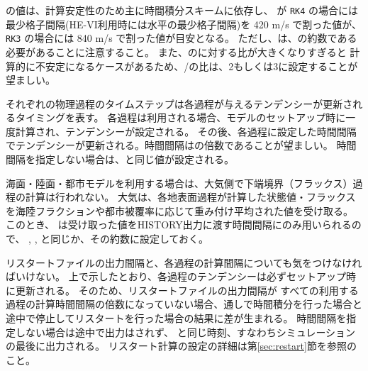 の値は、計算安定性のため主に時間積分スキームに依存し、
 が \verb|RK4| の場合には
最少格子間隔(HE-VI利用時には水平の最少格子間隔)を 420 m/s で割った値が、
\verb|RK3| の場合には 840 m/s で割った値が目安となる。
ただし、は、の約数である必要があることに注意すること。
また、のに対する比が大きくなりすぎると
計算的に不安定になるケースがあるため、/の比は、2もしくは3に設定することが望ましい。


それぞれの物理過程のタイムステップは各過程が与えるテンデンシーが更新されるタイミングを表す。
各過程は利用される場合、モデルのセットアップ時に一度計算され、テンデンシーが設定される。
その後、各過程に設定した時間間隔でテンデンシーが更新される。時間間隔はの倍数であることが望ましい。
時間間隔を指定しない場合は、と同じ値が設定される。


海面・陸面・都市モデルを利用する場合は、大気側で下端境界（フラックス）過程の計算は行われない。
大気は、各地表面過程が計算した状態値・フラックスを海陸フラクションや都市被覆率に応じて重み付け平均された値を受け取る。
このとき、 は受け取った値をHISTORY出力に渡す時間間隔にのみ用いられるので、
, ,  と同じか、その約数に設定しておく。

リスタートファイルの出力間隔と、各過程の計算間隔についても気をつけなければいけない。
上で示したとおり、各過程のテンデンシーは必ずセットアップ時に更新される。
そのため、リスタートファイルの出力間隔が
すべての利用する過程の計算時間間隔の倍数になっていない場合、通しで時間積分を行った場合と
途中で停止してリスタートを行った場合の結果に差が生まれる。
時間間隔を指定しない場合は途中で出力はされず、
と同じ時刻、すなわちシミュレーションの最後に出力される。
リスタート計算の設定の詳細は第\ref{sec:restart}節を参照のこと。

